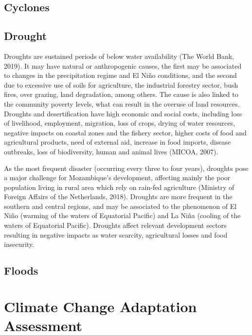 \documentclass[
]{book}
\begin{document}
\hypertarget{cyclones}{%
\subsection{Cyclones}\label{cyclones}}

\hypertarget{drought}{%
\subsection{Drought}\label{drought}}

Droughts are sustained periods of below water availability (The World Bank, 2019). It may have natural or anthropogenic causes, the first may be associated to changes in the precipitation regime and El Niño conditions, and the second due to excessive use of soils for agriculture, the industrial forestry sector, bush fires, over grazing, land degradation, among others. The cause is also linked to the community poverty levels, what can result in the overuse of land resources. Droughts and desertification have high economic and social costs, including loss of livelihood, employment, migration, loss of crops, drying of water resources, negative impacts on coastal zones and the fishery sector, higher costs of food and agricultural products, need of external aid, increase in food imports, disease outbreaks, loss of biodiversity, human and animal lives (MICOA, 2007).

As the most frequent disaster (occurring every three to four years), droughts pose a major challenge for Mozambique's development, affecting mainly the poor population living in rural area which rely on rain-fed agriculture (Ministry of Foreign Affairs of the Netherlands, 2018). Droughts are more frequent in the southern and central regions, and may be associated to the phenomenon of El Niño (warming of the waters of Equatorial Pacific) and La Niña (cooling of the waters of Equatorial Pacific). Droughts affect relevant development sectors resulting in negative impacts as water scarcity, agricultural losses and food insecurity.

\hypertarget{floods}{%
\subsection{Floods}\label{floods}}

\hypertarget{climate-change-adaptation-assessment}{%
\section{Climate Change Adaptation Assessment}\label{climate-change-adaptation-assessment}}
\end{document}
